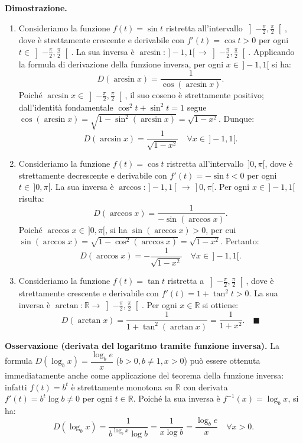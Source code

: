 \noindent\textbf{Dimostrazione.}
\begin{enumerate}
    \item Consideriamo la funzione $f(t) = \sin t$ ristretta all'intervallo $\left]-\frac{\pi}{2}, \frac{\pi}{2}\right[$, dove è strettamente crescente e derivabile con $f'(t) = \cos t > 0$ per ogni $t \in \left]-\frac{\pi}{2}, \frac{\pi}{2}\right[$. La sua inversa è $\arcsin \colon \,]-1, 1[\, \to \left]-\frac{\pi}{2}, \frac{\pi}{2}\right[$. Applicando la formula di derivazione della funzione inversa, per ogni $x \in \,]-1, 1[$ si ha:
    \[
        D(\arcsin x) = \frac{1}{\cos(\arcsin x)}.
    \]
    Poiché $\arcsin x \in \left]-\frac{\pi}{2}, \frac{\pi}{2}\right[$, il suo coseno è strettamente positivo; dall'identità fondamentale $\cos^2 t + \sin^2 t = 1$ segue $\cos(\arcsin x) = \sqrt{1 - \sin^2(\arcsin x)} = \sqrt{1 - x^2}$. Dunque:
    \[
        D(\arcsin x) = \frac{1}{\sqrt{1 - x^2}} \quad \forall x \in \,]-1, 1[.
    \]

    \item Consideriamo la funzione $f(t) = \cos t$ ristretta all'intervallo $\,]0, \pi[$, dove è strettamente decrescente e derivabile con $f'(t) = -\sin t < 0$ per ogni $t \in \,]0, \pi[$. La sua inversa è $\arccos \colon \,]-1, 1[\, \to \,]0, \pi[$. Per ogni $x \in \,]-1, 1[$ risulta:
    \[
        D(\arccos x) = \frac{1}{-\sin(\arccos x)}.
    \]
    Poiché $\arccos x \in \,]0, \pi[$, si ha $\sin(\arccos x) > 0$, per cui $\sin(\arccos x) = \sqrt{1 - \cos^2(\arccos x)} = \sqrt{1 - x^2}$. Pertanto:
    \[
        D(\arccos x) = -\frac{1}{\sqrt{1 - x^2}} \quad \forall x \in \,]-1, 1[.
    \]

    \item Consideriamo la funzione $f(t) = \tan t$ ristretta a $\left]-\frac{\pi}{2}, \frac{\pi}{2}\right[$, dove è strettamente crescente e derivabile con $f'(t) = 1 + \tan^2 t > 0$. La sua inversa è $\arctan \colon \mathbb{R} \to \left]-\frac{\pi}{2}, \frac{\pi}{2}\right[$. Per ogni $x \in \mathbb{R}$ si ottiene:
    \[
        D(\arctan x) = \frac{1}{1 + \tan^2(\arctan x)} = \frac{1}{1 + x^2}. \quad \blacksquare
    \]
\end{enumerate}

\noindent\textbf{Osservazione (derivata del logaritmo tramite funzione inversa).} La formula $D(\log_b x) = \dfrac{\log_b e}{x}$ ($b > 0, b \neq 1, x > 0$) può essere ottenuta immediatamente anche come applicazione del teorema della funzione inversa: infatti $f(t) = b^t$ è strettamente monotona su $\mathbb{R}$ con derivata $f'(t) = b^t \log b \neq 0$ per ogni $t \in \mathbb{R}$. Poiché la sua inversa è $f^{-1}(x) = \log_b x$, si ha:
\[
    D(\log_b x) = \frac{1}{b^{\log_b x} \log b} = \frac{1}{x \log b} = \frac{\log_b e}{x} \quad \forall x > 0.
\]

